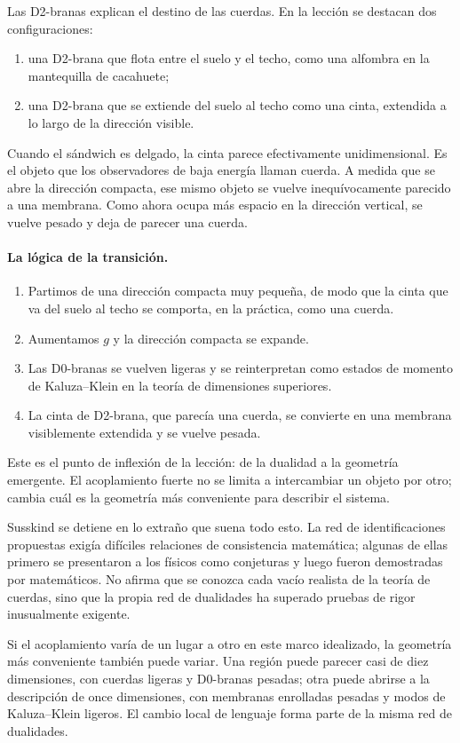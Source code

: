 Las D2-branas explican el destino de las cuerdas. En la lección se destacan dos configuraciones:
\begin{enumerate}
\item una D2-brana que flota entre el suelo y el techo, como una alfombra en la mantequilla de cacahuete;
\item una D2-brana que se extiende del suelo al techo como una cinta, extendida a lo largo de la dirección visible.
\end{enumerate}
Cuando el sándwich es delgado, la cinta parece efectivamente unidimensional. Es el objeto que los observadores de baja energía llaman cuerda. A medida que se abre la dirección compacta, ese mismo objeto se vuelve inequívocamente parecido a una membrana. Como ahora ocupa más espacio en la dirección vertical, se vuelve pesado y deja de parecer una cuerda.

\paragraph{La lógica de la transición.}
\begin{enumerate}
\item Partimos de una dirección compacta muy pequeña, de modo que la cinta que va del suelo al techo se comporta, en la práctica, como una cuerda.
\item Aumentamos \(g\) y la dirección compacta se expande.
\item Las D0-branas se vuelven ligeras y se reinterpretan como estados de momento de Kaluza--Klein en la teoría de dimensiones superiores.
\item La cinta de D2-brana, que parecía una cuerda, se convierte en una membrana visiblemente extendida y se vuelve pesada.
\end{enumerate}
Este es el punto de inflexión de la lección: de la dualidad a la geometría emergente. El acoplamiento fuerte no se limita a intercambiar un objeto por otro; cambia cuál es la geometría más conveniente para describir el sistema.

Susskind se detiene en lo extraño que suena todo esto. La red de identificaciones propuestas exigía difíciles relaciones de consistencia matemática; algunas de ellas primero se presentaron a los físicos como conjeturas y luego fueron demostradas por matemáticos. No afirma que se conozca cada vacío realista de la teoría de cuerdas, sino que la propia red de dualidades ha superado pruebas de rigor inusualmente exigente.

Si el acoplamiento varía de un lugar a otro en este marco idealizado, la geometría más conveniente también puede variar. Una región puede parecer casi de diez dimensiones, con cuerdas ligeras y D0-branas pesadas; otra puede abrirse a la descripción de once dimensiones, con membranas enrolladas pesadas y modos de Kaluza--Klein ligeros. El cambio local de lenguaje forma parte de la misma red de dualidades.

